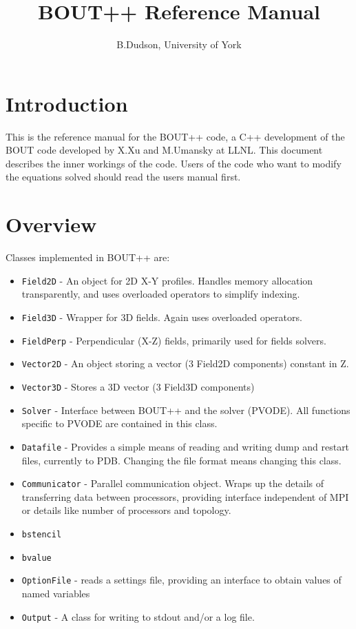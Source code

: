 \documentclass[12pt, a4paper]{article}
\newcommand{\code}[1]{\texttt{#1}}
\begin{document}
\title{BOUT++ Reference Manual}
\author{B.Dudson, University of York}

\maketitle

\tableofcontents

\section{Introduction}

This is the reference manual for the BOUT++ code, a C++ development of the
BOUT code developed by X.Xu and M.Umansky at LLNL. This document describes
the inner workings of the code. Users of the code who want to modify 
the equations solved should read the users manual first.

\section{Overview}

Classes implemented in BOUT++ are:
\begin{itemize}
\item \code{Field2D} - An object for 2D X-Y profiles. Handles memory allocation transparently,
  and uses overloaded operators to simplify indexing.
\item \code{Field3D} - Wrapper for 3D fields. Again uses overloaded operators.
\item \code{FieldPerp} - Perpendicular (X-Z) fields, primarily used for fields solvers.
\item \code{Vector2D} - An object storing a vector (3 Field2D components) constant in Z.
\item \code{Vector3D} - Stores a 3D vector (3 Field3D components)
\item \code{Solver} - Interface between BOUT++ and the solver (PVODE). All
  functions specific to PVODE are contained in this class.
\item \code{Datafile} - Provides a simple means of reading and writing dump and restart files,
  currently to PDB. Changing the file format means changing this class.
\item \code{Communicator} - Parallel communication object. Wraps up the details
  of transferring data between processors, providing interface independent of MPI or
  details like number of processors and topology.
\item \code{bstencil}
\item \code{bvalue}
\item \code{OptionFile} - reads a settings file, providing an interface to obtain values
  of named variables
\item \code{Output} - A class for writing to stdout and/or a log file.
\end{itemize}
\end{document}
